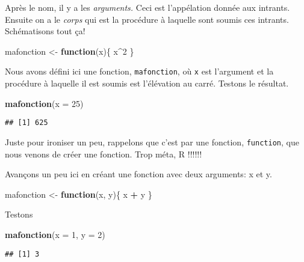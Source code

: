 \documentclass[]{book}
\newenvironment{Shaded}{\begin{snugshade}}{\end{snugshade}}
\newcommand{\KeywordTok}[1]{\textcolor[rgb]{0.13,0.29,0.53}{\textbf{#1}}}
\newcommand{\DataTypeTok}[1]{\textcolor[rgb]{0.13,0.29,0.53}{#1}}
\newcommand{\DecValTok}[1]{\textcolor[rgb]{0.00,0.00,0.81}{#1}}
\newcommand{\StringTok}[1]{\textcolor[rgb]{0.31,0.60,0.02}{#1}}
\newcommand{\ControlFlowTok}[1]{\textcolor[rgb]{0.13,0.29,0.53}{\textbf{#1}}}
\newcommand{\OperatorTok}[1]{\textcolor[rgb]{0.81,0.36,0.00}{\textbf{#1}}}
\newcommand{\NormalTok}[1]{#1}
\begin{document}
Après le nom, il y a les \emph{arguments.} Ceci est l'appélation donnée
aux intrants. Ensuite on a le \emph{corps} qui est la procédure à
laquelle sont soumis ces intrants. Schématisons tout ça!

\begin{Shaded}
\begin{Highlighting}[]
\NormalTok{mafonction <-}\StringTok{ }\ControlFlowTok{function}\NormalTok{(x)\{}
\NormalTok{  x}\OperatorTok{^}\DecValTok{2}
\NormalTok{  \}}
\end{Highlighting}
\end{Shaded}

Nous avons défini ici une fonction, \texttt{mafonction}, où \texttt{x}
est l'argument et la procédure à laquelle il est soumis est l'élévation
au carré. Testons le résultat.

\begin{Shaded}
\begin{Highlighting}[]
\KeywordTok{mafonction}\NormalTok{(}\DataTypeTok{x =} \DecValTok{25}\NormalTok{)}
\end{Highlighting}
\end{Shaded}

\begin{verbatim}
## [1] 625
\end{verbatim}

Juste pour ironiser un peu, rappelons que c'est par une fonction,
\texttt{function}, que nous venons de créer une fonction. Trop méta, R
!!!!!!

Avançons un peu ici en créant une fonction avec deux arguments: x et y.

\begin{Shaded}
\begin{Highlighting}[]
\NormalTok{mafonction <-}\StringTok{ }\ControlFlowTok{function}\NormalTok{(x, y)\{}
\NormalTok{  x }\OperatorTok{+}\StringTok{ }\NormalTok{y}
\NormalTok{  \}}
\end{Highlighting}
\end{Shaded}

Testons

\begin{Shaded}
\begin{Highlighting}[]
\KeywordTok{mafonction}\NormalTok{(}\DataTypeTok{x =} \DecValTok{1}\NormalTok{, }\DataTypeTok{y =} \DecValTok{2}\NormalTok{)}
\end{Highlighting}
\end{Shaded}

\begin{verbatim}
## [1] 3
\end{verbatim}
\end{document}
